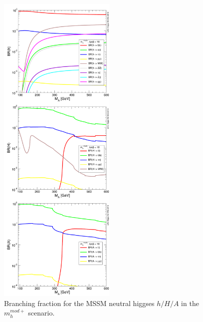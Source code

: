 \begin{figure}[tp]
     \begin{center}

            \includegraphics[width=0.5\textwidth]{figure/br.png}

    \end{center}
    \caption{Branching fraction for the MSSM neutral higgses $h/H/A$ in the $m_h^{mod+}$ scenario.}
   \label{fig:br}

\end{figure}

